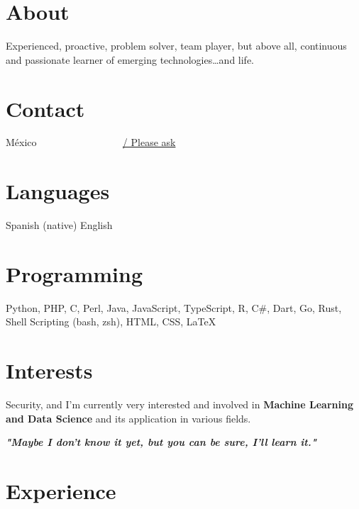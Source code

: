 \documentclass[]{friggeri-cv}
\makeatletter
\newcommand{\phone}[1]{%
  \href{mailto:miguel@gulev.org?subject=We are interested in you!&body=Send us your phone please!}{{\faWhatsapp}/{\faPhoneSquare} #1}
}
\makeatother
\begin{document}

\begin{aside} %
    \section{About}
    Experienced, proactive, problem solver, team player, but above all, continuous and passionate learner of emerging technologies\ldots and life.
    ~
    \section{Contact}
    {\faMapMarker} México
    ~
    ~{\nfURL}
    ~{\nfURL}
    ~{\nfURL}
    ~{\nfURL}
    ~{\nfURL}
    ~{\nfURL}
    ~{\nfURL}
    ~{\nfURL}
    ~{\nfURL}
    \phone{Please ask}~{\nfURL}
    ~
    \section{Languages}
    Spanish (native)
    English
    ~
    \section{Programming}
    Python, PHP, C, Perl, Java, JavaScript, TypeScript, R, C\#, Dart, Go, Rust, Shell Scripting (bash, zsh), HTML, CSS, {\LaTeX}
    ~
    \section{Interests}
    Security, and I’m currently very interested and involved in \textbf{Machine Learning and Data Science} and its application in various fields.
\end{aside}

\begin{center}
    \large{\textbf{\textit{"Maybe I don't know it yet, but you can be sure, I'll learn it."}}}
\end{center}

\section{Experience}
\end{document}
